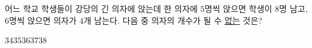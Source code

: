 어느 학교 학생들이 강당의 긴 의자에 앉는데 한 의자에 $5$명씩 앉으면 학생이 $8$명 남고, $6$명씩 앉으면 의자가 $4$개 남는다. 다음 중 의자의 개수가 될 수 \underline{없는} 것은?
\begin{choices32}{$34$}{$35$}{$36$}{$37$}{$38$}\end{choices32}
